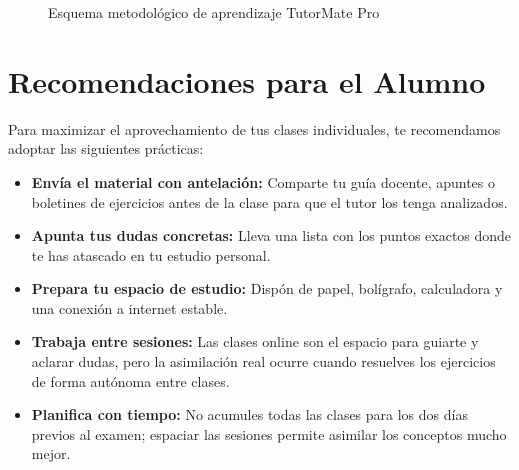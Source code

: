 \documentclass[11pt,a4paper]{article}
\begin{document}
\begin{figure}[h]
\centering
{}
\caption{Esquema metodológico de aprendizaje TutorMate Pro}
\label{fig:flujo}
\end{figure}

\newpage
\section{Recomendaciones para el Alumno}
Para maximizar el aprovechamiento de tus clases individuales, te recomendamos adoptar las siguientes prácticas:
\begin{itemize}
    \item \textbf{Envía el material con antelación:} Comparte tu guía docente, apuntes o boletines de ejercicios antes de la clase para que el tutor los tenga analizados.
    \item \textbf{Apunta tus dudas concretas:} Lleva una lista con los puntos exactos donde te has atascado en tu estudio personal.
    \item \textbf{Prepara tu espacio de estudio:} Dispón de papel, bolígrafo, calculadora y una conexión a internet estable.
    \item \textbf{Trabaja entre sesiones:} Las clases online son el espacio para guiarte y aclarar dudas, pero la asimilación real ocurre cuando resuelves los ejercicios de forma autónoma entre clases.
    \item \textbf{Planifica con tiempo:} No acumules todas las clases para los dos días previos al examen; espaciar las sesiones permite asimilar los conceptos mucho mejor.
\end{itemize}
\end{document}
